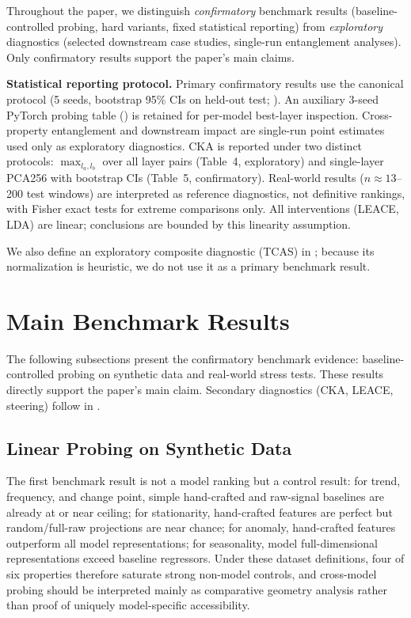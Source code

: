 \documentclass{article}
\begin{document}
Throughout the paper, we distinguish \emph{confirmatory} benchmark results (baseline-controlled probing, hard variants, fixed statistical reporting) from \emph{exploratory} diagnostics (selected downstream case studies, single-run entanglement analyses). Only confirmatory results support the paper's main claims.

\textbf{Statistical reporting protocol.} Primary confirmatory results use the canonical protocol (5 seeds, bootstrap 95\% CIs on held-out test; ). An auxiliary 3-seed PyTorch probing table () is retained for per-model best-layer inspection. Cross-property entanglement and downstream impact are single-run point estimates used only as exploratory diagnostics. CKA is reported under two distinct protocols: $\max_{l_a,l_b}$ over all layer pairs (Table~4, exploratory) and single-layer PCA256 with bootstrap CIs (Table~5, confirmatory). Real-world results ($n \approx 13$--200 test windows) are interpreted as reference diagnostics, not definitive rankings, with Fisher exact tests for extreme comparisons only. All interventions (LEACE, LDA) are linear; conclusions are bounded by this linearity assumption.

We also define an exploratory composite diagnostic (TCAS) in ; because its normalization is heuristic, we do not use it as a primary benchmark result.

\section{Main Benchmark Results}

The following subsections present the confirmatory benchmark evidence: baseline-controlled probing on synthetic data and real-world stress tests. These results directly support the paper's main claim. Secondary diagnostics (CKA, LEACE, steering) follow in .

\subsection{Linear Probing on Synthetic Data}

The first benchmark result is not a model ranking but a control result: for trend, frequency, and change point, simple hand-crafted and raw-signal baselines are already at or near ceiling; for stationarity, hand-crafted features are perfect but random/full-raw projections are near chance; for anomaly, hand-crafted features outperform all model representations; for seasonality, model full-dimensional representations exceed baseline regressors. Under these dataset definitions, four of six properties therefore saturate strong non-model controls, and cross-model probing should be interpreted mainly as comparative geometry analysis rather than proof of uniquely model-specific accessibility.
\end{document}

